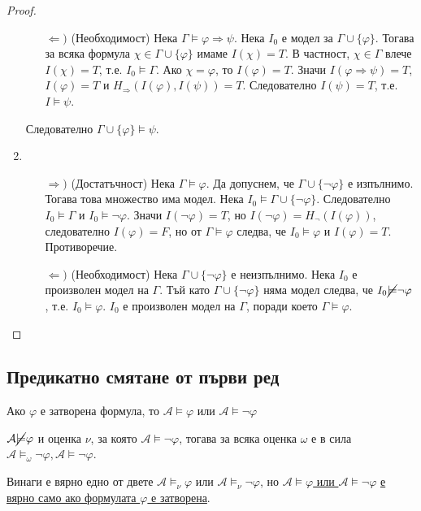 \documentclass{article}
\begin{document}
\begin{prop}
\begin{proof}
\begin{enumerate}
\begin{itemize}
\item[$\Leftarrow)$] (Необходимост) Нека $\Gamma \models \varphi \Rightarrow \psi$. Нека $I_0$ е модел за $\Gamma \cup \{\varphi\}$. Тогава за всяка формула $\chi \in \Gamma \cup \{\varphi\}$ имаме $I(\chi) = T$. В частност, $\chi \in \Gamma$ влече $I(\chi) = T$, т.е. $I_0 \models \Gamma$. Ако $\chi = \varphi$, то $I(\varphi) = T$. Значи $I(\varphi  \Rightarrow \psi) = T$, $I(\varphi) = T$ и $H_\Rightarrow(I(\varphi), I(\psi)) = T$. Следователно $I(\psi) = T$, т.е. $I \models \psi$.
\end{itemize}
Следователно $\Gamma \cup \{\varphi\} \models \psi$.
\setcounter{enumi}{5}
\item
\begin{itemize}
\item[$\Rightarrow)$] (Достатъчност) Нека $\Gamma \models \varphi$. Да допуснем, че $\Gamma \cup \{\neg\varphi\}$ е изпълнимо. Тогава това множество има модел. Нека $I_0 \models \Gamma \cup \{\neg\varphi\}$. Следователно $I_0 \models \Gamma$ и $I_0 \models \neg\varphi$. Значи $I(\neg\varphi) = T$, но $I(\neg\varphi) = H_\neg(I(\varphi))$, следователно $I(\varphi) = F$, но от $\Gamma \models \varphi$ следва, че $I_0 \models \varphi$  и $I(\varphi) = T$. Противоречие.
\item[$\Leftarrow)$] (Необходимост) Нека $\Gamma \cup \{\neg\varphi\}$ е неизпълнимо. Нека $I_0$ е произволен модел на $\Gamma$. Тъй като $\Gamma \cup \{\neg\varphi\}$ няма модел следва, че 	$I_0 \cancel{\models} \neg\varphi$, т.е. $I_0 \models \varphi$. $I_0$ е произволен модел на $\Gamma$, поради което $\Gamma \models \varphi$.
\end{itemize}
\end{enumerate}
\end{proof}
\fi

\end{prop}

\subsection*{Предикатно смятане от първи ред}

\begin{prop}
Ако $\varphi$ е затворена формула, то $\mathcal{A} \models \varphi$ или $\mathcal{A} \models \neg\varphi$ 

\begin{remark}
$\mathcal{A} \cancel{\models} \varphi$ и оценка $\nu$, за която $\mathcal{A} \models \neg\varphi$, тогава за всяка оценка $\omega$ е в сила $\mathcal{A} \models_\omega \neg\varphi, \mathcal{A} \models \neg\varphi$.
\end{remark}

\begin{remark}
Винаги е вярно едно от двете $\mathcal{A} \models_\nu \varphi$ или $\mathcal{A} \models_\nu \neg\varphi$, но \underline{$\mathcal{A} \models \varphi$ или $\mathcal{A} \models \neg\varphi$} \underline{е вярно само ако формулата $\varphi$ е затворена}.
\end{remark}
\end{prop}
\end{document}
